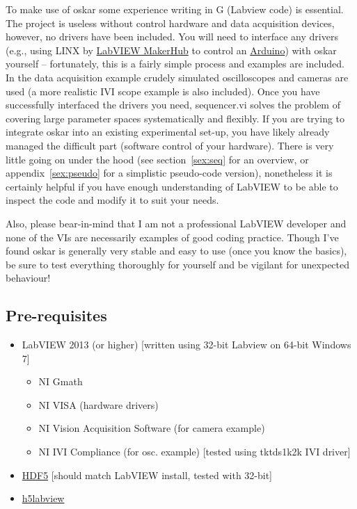 \documentclass[10pt,a4paper]{article}
\begin{document}
To make use of oskar some experience writing in G (Labview code) is essential. The project is useless without control hardware and data acquisition devices, however, no drivers have been included. You will need to interface any drivers (e.g., using  LINX by \href{https://www.labviewmakerhub.com}{LabVIEW MakerHub} to control an  \href{https://www.arduino.cc/}{Arduino}) with oskar yourself -- fortunately, this is a fairly simple process and examples are included.  In the data acquisition example crudely simulated oscilloscopes and cameras are used (a more realistic IVI scope example is also included).  Once you have successfully  interfaced the drivers you need, sequencer.vi solves the problem of covering large parameter spaces systematically and flexibly.  If you are trying to integrate oskar into an existing experimental set-up, you have likely already managed the difficult part (software control of your hardware).  There is very little going on under the hood (see section~\ref{sex:seq} for an overview, or appendix~\ref{sex:pseudo} for a simplistic pseudo-code version),  nonetheless it is certainly helpful if you have enough understanding of LabVIEW to be able to inspect the code and modify it to suit your needs.

Also, please bear-in-mind that I am not a professional LabVIEW developer and none of the VIs are necessarily examples of good coding practice. Though I've found oskar is generally very stable and easy to use (once you know the basics), be sure to test everything thoroughly for yourself and be vigilant for unexpected behaviour!
\subsection*{Pre-requisites}

\begin{itemize}
\item LabVIEW 2013 (or higher)  [written using 32-bit Labview on 64-bit Windows 7]
	 \begin{itemize}
	 	\item NI Gmath
	 	\item NI VISA (hardware drivers)
	 	\item NI Vision Acquisition Software (for camera example)
	 	\item NI IVI Compliance (for osc. example) [tested using tktds1k2k IVI driver]
	 \end{itemize}

\item  \href{https://www.hdfgroup.org}{HDF5} [should match LabVIEW install, tested with 32-bit]

\item  \href{http://h5labview.sourceforge.net/}{h5labview}

\end{itemize}
\end{document}
